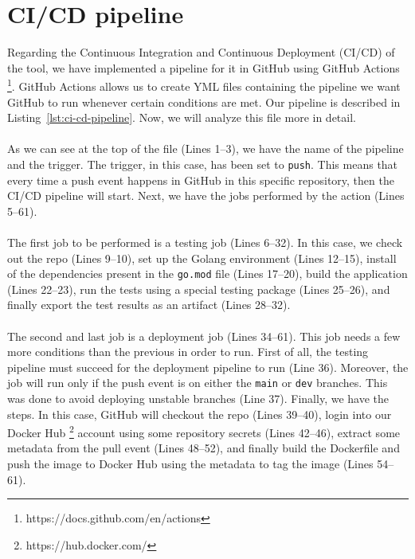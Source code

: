 \section{CI/CD pipeline}\label{sec:ci-cd-pipeline}
Regarding the Continuous Integration and Continuous Deployment (CI/CD) of the tool, we have implemented a pipeline for it in GitHub using GitHub Actions \footnote{https://docs.github.com/en/actions}.
GitHub Actions allows us to create YML files containing the pipeline we want GitHub to run whenever certain conditions are met.
Our pipeline is described in Listing~\ref{lst:ci-cd-pipeline}.
Now, we will analyze this file more in detail. \\ \\
As we can see at the top of the file (Lines 1--3), we have the name of the pipeline and the trigger.
The trigger, in this case, has been set to \verb|push|.
This means that every time a push event happens in GitHub in this specific repository, then the CI/CD pipeline will start.
Next, we have the jobs performed by the action (Lines 5--61). \\ \\
The first job to be performed is a testing job (Lines 6--32).
In this case, we check out the repo (Lines 9--10), set up the Golang environment (Lines 12--15), install of the dependencies present in the \verb|go.mod| file (Lines 17--20), build the application (Lines 22--23), run the tests using a special testing package (Lines 25--26), and finally export the test results as an artifact (Lines 28--32). \\ \\
The second and last job is a deployment job (Lines 34--61).
This job needs a few more conditions than the previous in order to run.
First of all, the testing pipeline must succeed for the deployment pipeline to run (Line 36).
Moreover, the job will run only if the push event is on either the \verb|main| or \verb|dev| branches.
This was done to avoid deploying unstable branches (Line 37).
Finally, we have the steps.
In this case, GitHub will checkout the repo (Lines 39--40), login into our Docker Hub \footnote{https://hub.docker.com/} account using some repository secrets (Lines 42--46), extract some metadata from the pull event (Lines 48--52), and finally build the Dockerfile and push the image to Docker Hub using the metadata to tag the image (Lines 54--61).

